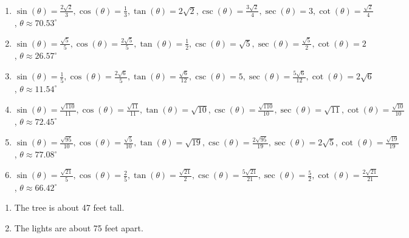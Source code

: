 \begin{enumerate}
\item $\sin(\theta) = \frac{2\sqrt{2}}{3}, \cos(\theta) = \frac{1}{3}, \tan(\theta) = 2\sqrt{2}, \csc(\theta) = \frac{3\sqrt{2}}{4}, \sec(\theta) = 3, \cot(\theta) = \frac{\sqrt{2}}{4}$, $\theta \approx 70.53^{\circ}$

\item $\sin(\theta) = \frac{\sqrt{5}}{5}, \cos(\theta) = \frac{2\sqrt{5}}{5}, \tan(\theta) = \frac{1}{2}, \csc(\theta) = \sqrt{5}, \sec(\theta) = \frac{\sqrt{5}}{2}, \cot(\theta) = 2$, $\theta \approx 26.57^{\circ}$

\item $\sin(\theta) = \frac{1}{5}, \cos(\theta) = \frac{2\sqrt{6}}{5}, \tan(\theta) = \frac{\sqrt{6}}{12}, \csc(\theta) = 5, \sec(\theta) = \frac{5\sqrt{6}}{12}, \cot(\theta) = 2\sqrt{6}$, $\theta \approx 11.54^{\circ}$

\item $\sin(\theta) = \frac{\sqrt{110}}{11}, \cos(\theta) = \frac{\sqrt{11}}{11}, \tan(\theta) = \sqrt{10}, \csc(\theta) = \frac{\sqrt{110}}{10}, \sec(\theta) = \sqrt{11}, \cot(\theta) = \frac{\sqrt{10}}{10}$, $\theta \approx 72.45^{\circ}$

\item $\sin(\theta) = \frac{\sqrt{95}}{10}, \cos(\theta) = \frac{\sqrt{5}}{10}, \tan(\theta) = \sqrt{19}, \csc(\theta) = \frac{2\sqrt{95}}{19}, \sec(\theta) = 2\sqrt{5}, \cot(\theta) = \frac{\sqrt{19}}{19}$, $\theta \approx 77.08^{\circ}$

\item $\sin(\theta) = \frac{\sqrt{21}}{5}, \cos(\theta) = \frac{2}{5}, \tan(\theta) = \frac{\sqrt{21}}{2}, \csc(\theta) = \frac{5\sqrt{21}}{21}, \sec(\theta) = \frac{5}{2}, \cot(\theta) = \frac{2\sqrt{21}}{21}$, $\theta \approx  66.42^{\circ}$

\setcounter{HW}{\value{enumi}}

\end{enumerate}

\begin{enumerate}

\setcounter{enumi}{\value{HW}}

\item The tree is about 47 feet tall.

\item The lights are about 75 feet apart.

\setcounter{HW}{\value{enumi}}

\end{enumerate}

